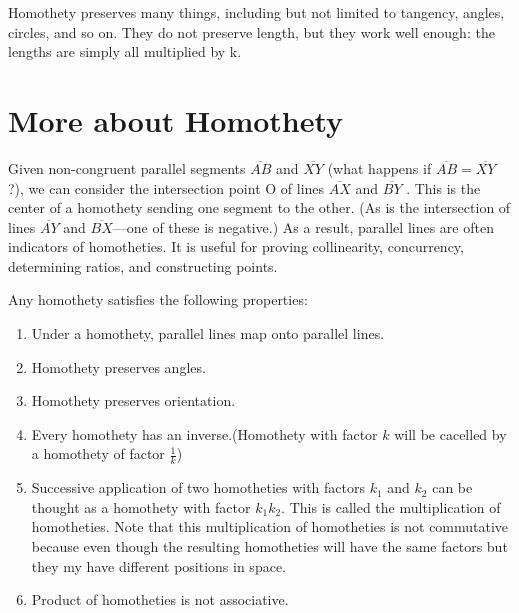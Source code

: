 \documentclass[12pt]{article}
\theoremstyle{definition}
\begin{document}
Homothety preserves many things, including but not limited to tangency, angles, circles, and so on. They do not preserve length, but they work well enough: the lengths are simply all multiplied by k.

\section{More about Homothety}
Given non-congruent parallel segments $\overline{AB}$ and $\overline{XY}$ (what happens if $\overline{AB} = \overline{XY}$ ?), we can consider the intersection point O of lines $\overline{AX}$ and $\overline{BY}$ . This is the center of a homothety sending one segment to the other. (As is the intersection of lines $\overline{AY}$ and $\overline{BX}$—one of these is negative.) As a result, parallel lines are often indicators of homotheties. It is useful for proving collinearity, concurrency, determining ratios, and constructing points. 

Any homothety satisfies the following properties:
\begin{enumerate}
    \item Under a homothety, parallel lines map onto parallel lines.
    \item Homothety preserves angles.
    \item Homothety preserves orientation.
    \item Every homothety has an inverse.(Homothety with factor $k$ will be cacelled by a homothety of factor $\displaystyle\frac{1}{k}$) 
    \item Successive application of two homotheties with factors $k_1$ and $k_2$ can be thought as a homothety with factor $k_1k_2$. This is called the multiplication of homotheties. Note that this multiplication of homotheties is not commutative because even though the resulting homotheties will have the same factors but they my have different positions in space.
    \item Product of homotheties is not associative.
\end{enumerate}
\end{document}
